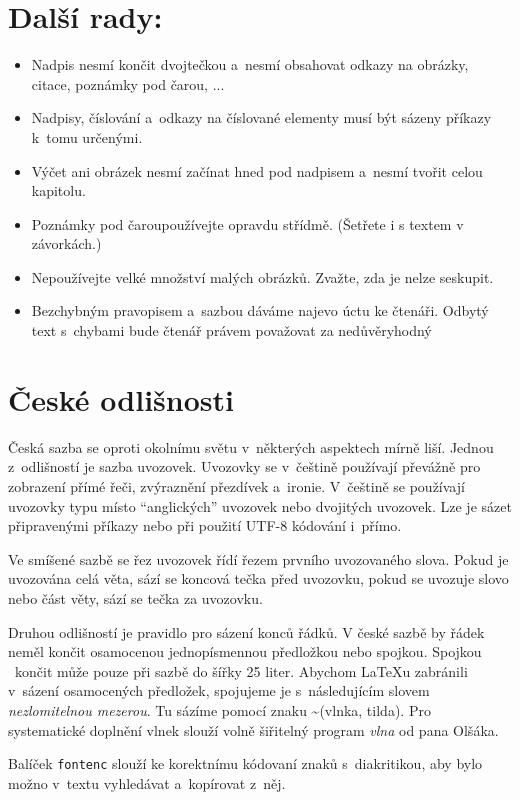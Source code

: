 \documentclass[a4paper, twocolumn, 10pt]{article}
\begin{document}
\section{Další rady:}
\label{sec:tips}
\begin{itemize}
  \item Nadpis nesmí končit dvojtečkou a~nesmí obsahovat odkazy na obrázky, citace, poznámky pod čarou, ...


  \item Nadpisy, číslování a~odkazy na číslované elementy musí být sázeny příkazy k~tomu určenými.
  \item Výčet ani obrázek nesmí začínat hned pod nadpisem a~nesmí tvořit celou kapitolu.
  \item Poznámky pod čarou\footnotemark[1] používejte opravdu střídmě. (Šetřete i s textem v závorkách.)
  \item Nepoužívejte velké množství malých obrázků. Zvažte, zda je nelze seskupit.
  \item Bezchybným pravopisem a~sazbou dáváme najevo úctu ke čtenáři. Odbytý text s~chybami bude čtenář právem považovat za nedůvěryhodný
\end{itemize}

\section{České odlišnosti}
\label{sec:differences}
Česká sazba se oproti okolnímu světu v~některých aspektech mírně liší. Jednou z~odlišností je sazba uvozovek. Uvozovky se v~češtině používají převážně pro zobrazení přímé řeči, zvýraznění přezdívek a~ironie. V~češtině se používají uvozovky typu  místo ``anglických'' uvozovek nebo \textquotedbl dvojitých \textquotedbl uvozovek. Lze je sázet připravenými příkazy nebo při použití UTF-8 kódování i~přímo.
\par
Ve smíšené sazbě se řez uvozovek řídí řezem prvního uvozovaného slova. Pokud je uvozována celá věta, sází se koncová tečka před uvozovku, pokud se uvozuje slovo nebo část věty, sází se tečka za uvozovku.
\par
Druhou odlišností je pravidlo pro sázení konců řádků. V české sazbě by řádek neměl končit osamocenou jednopísmennou předložkou nebo spojkou. Spojkou ~končit může pouze při sazbě do šířky 25 liter. Abychom \LaTeX u zabránili v~sázení osamocených předložek, spojujeme je s~následujícím slovem \emph{nezlomitelnou mezerou}. Tu sázíme pomocí znaku \textasciitilde (vlnka, tilda). Pro systematické doplnění vlnek slouží volně šiřitelný program \emph{vlna} od pana Olšáka\footnotemark[2].
\par
Balíček \texttt{fontenc} slouží ke korektnímu kódovaní znaků s~diakritikou, aby bylo možno v~textu vyhledávat a~kopírovat z~něj.
\end{document}
